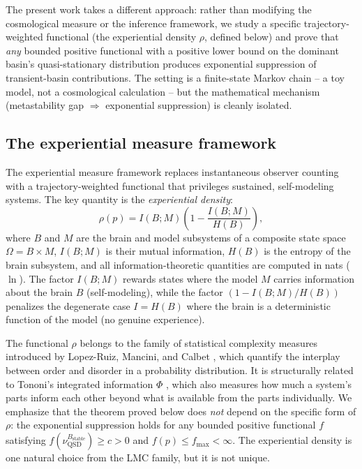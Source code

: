 \documentclass[11pt]{article}
\newcommand{\Bstable}{B_{\mathrm{stable}}}
\newcommand{\QSD}{\mathrm{QSD}}
\begin{document}
The present work takes a different approach: rather than modifying the
cosmological measure or the inference framework, we study a specific
trajectory-weighted functional (the experiential density $\rho$,
defined below) and prove that \emph{any} bounded positive functional
with a positive lower bound on the dominant basin's quasi-stationary
distribution produces exponential suppression of transient-basin
contributions.  The setting is a finite-state Markov chain -- a toy
model, not a cosmological calculation -- but the mathematical
mechanism (metastability gap $\Rightarrow$ exponential suppression)
is cleanly isolated.

\subsection{The experiential measure framework}

The experiential measure framework replaces instantaneous observer
counting with a trajectory-weighted functional that privileges
sustained, self-modeling systems.  The key quantity is the
\emph{experiential density}:
\begin{equation}\label{eq:rho-def}
  \rho(p) = I(B;M)\!\left(1 - \frac{I(B;M)}{H(B)}\right),
\end{equation}
where $B$ and $M$ are the brain and model subsystems of a composite
state space $\Omega = B \times M$, $I(B;M)$ is their mutual
information, $H(B)$ is the entropy of the brain subsystem, and all
information-theoretic quantities are computed in nats ($\ln$).  The
factor $I(B;M)$ rewards states where the model $M$ carries information
about the brain $B$ (self-modeling), while the factor
$(1 - I(B;M)/H(B))$ penalizes the degenerate case $I = H(B)$ where
the brain is a deterministic function of the model (no genuine
experience).

The functional $\rho$ belongs to the family of statistical complexity
measures introduced by Lopez-Ruiz, Mancini, and Calbet \cite{LMC1995},
which quantify the interplay between order and disorder in a
probability distribution.  It is structurally related to Tononi's
integrated information $\Phi$ \cite{Tononi2004}, which also measures
how much a system's parts inform each other beyond what is available
from the parts individually.  We emphasize that the theorem proved
below does \emph{not} depend on the specific form of $\rho$: the
exponential suppression holds for any bounded positive functional
$f$ satisfying $f(\nu_\QSD^{\Bstable}) \geq c > 0$ and
$f(p) \leq f_{\max} < \infty$.  The experiential density is one
natural choice from the LMC family, but it is not unique.
\end{document}
